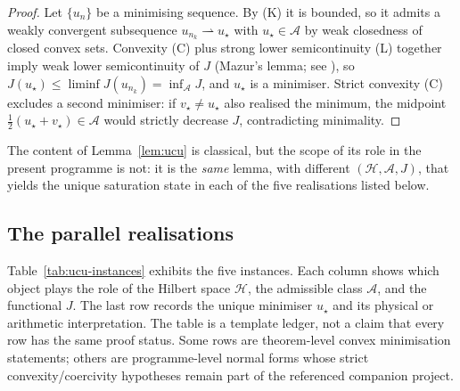 \documentclass[11pt]{article}
\theoremstyle{definition}
\theoremstyle{remark}
\begin{document}
\begin{proof}
Let $\{u_n\}$ be a minimising sequence. By (K) it is bounded, so it
admits a weakly convergent subsequence $u_{n_k} \rightharpoonup u_\star$
with $u_\star \in \mathcal{A}$ by weak closedness of closed convex
sets. Convexity (C) plus strong lower semicontinuity (L) together
imply weak lower semicontinuity of $J$ (Mazur's lemma; see
\cite[Prop.~II.1.2]{EkelandTemam1999}), so
$J(u_\star) \leq \liminf J(u_{n_k}) = \inf_{\mathcal{A}} J$, and
$u_\star$ is a minimiser. Strict convexity (C) excludes a second
minimiser: if $v_\star \neq u_\star$ also realised the minimum,
the midpoint $\tfrac{1}{2}(u_\star + v_\star) \in \mathcal{A}$
would strictly decrease $J$, contradicting minimality.
\end{proof}

The content of Lemma~\ref{lem:ucu} is classical, but the scope of
its role in the present programme is not: it is the \emph{same}
lemma, with different $(\mathcal{H}, \mathcal{A}, J)$, that yields
the unique saturation state in each of the five realisations
listed below.

\subsection{The parallel realisations}
\label{sec:ucu-instances}

Table~\ref{tab:ucu-instances} exhibits the five instances.
Each column shows which object plays the role of the Hilbert space
$\mathcal{H}$, the admissible class $\mathcal{A}$, and the
functional $J$. The last row records the unique minimiser $u_\star$
and its physical or arithmetic interpretation.
The table is a template ledger, not a claim that every row has the
same proof status. Some rows are theorem-level convex minimisation
statements; others are programme-level normal forms whose strict
convexity/coercivity hypotheses remain part of the referenced
companion project.
\end{document}
